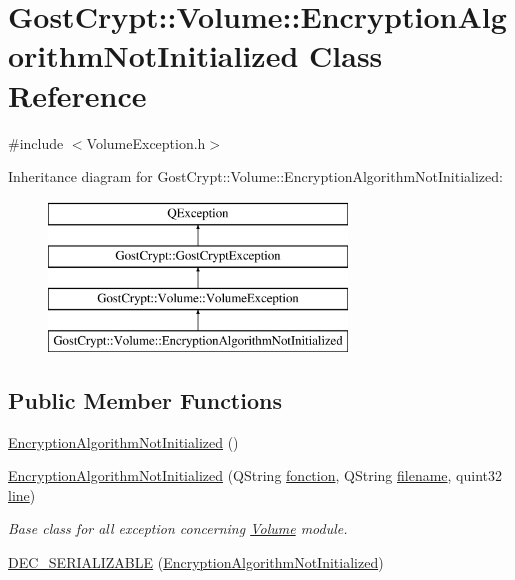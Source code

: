 \hypertarget{class_gost_crypt_1_1_volume_1_1_encryption_algorithm_not_initialized}{}\section{Gost\+Crypt\+:\+:Volume\+:\+:Encryption\+Algorithm\+Not\+Initialized Class Reference}
\label{class_gost_crypt_1_1_volume_1_1_encryption_algorithm_not_initialized}


{\ttfamily \#include $<$Volume\+Exception.\+h$>$}

Inheritance diagram for Gost\+Crypt\+:\+:Volume\+:\+:Encryption\+Algorithm\+Not\+Initialized\+:\begin{figure}[H]
\begin{center}
\leavevmode
\includegraphics[height=4.000000cm]{class_gost_crypt_1_1_volume_1_1_encryption_algorithm_not_initialized}
\end{center}
\end{figure}
\subsection*{Public Member Functions}
\begin{DoxyCompactItemize}
\item 
\hyperlink{class_gost_crypt_1_1_volume_1_1_encryption_algorithm_not_initialized_a24d9cb4d031cb7d8b6355bf6dbe48321}{Encryption\+Algorithm\+Not\+Initialized} ()
\item 
\hyperlink{class_gost_crypt_1_1_volume_1_1_encryption_algorithm_not_initialized_a4544c2224e4651409a23baa12570fccb}{Encryption\+Algorithm\+Not\+Initialized} (Q\+String \hyperlink{class_gost_crypt_1_1_gost_crypt_exception_a29b8c93d5efbb1ff369107385725a939}{fonction}, Q\+String \hyperlink{class_gost_crypt_1_1_gost_crypt_exception_a749a12375f4ba9d502623b99d8252f38}{filename}, quint32 \hyperlink{class_gost_crypt_1_1_gost_crypt_exception_abf506d911f12a4e969eea500f90bd32c}{line})
\begin{DoxyCompactList}\small\item\em Base class for all exception concerning \hyperlink{class_gost_crypt_1_1_volume_1_1_volume}{Volume} module. \end{DoxyCompactList}\item 
\hyperlink{class_gost_crypt_1_1_volume_1_1_encryption_algorithm_not_initialized_a3a2227f67a52325e70ab3709b1e7804f}{D\+E\+C\+\_\+\+S\+E\+R\+I\+A\+L\+I\+Z\+A\+B\+LE} (\hyperlink{class_gost_crypt_1_1_volume_1_1_encryption_algorithm_not_initialized}{Encryption\+Algorithm\+Not\+Initialized})
\end{DoxyCompactItemize}
